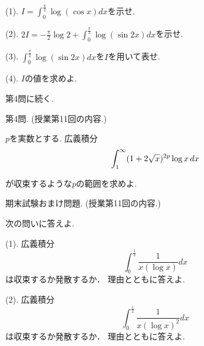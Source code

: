 \documentclass[dvipdfmx,a4paper,11pt]{article}
\theoremstyle{definition}
\begin{document}
     \vspace{11pt}
     
(1).  $I = \int_{0}^{\frac{\pi}{2}} \log (\cos x) dx$を示せ.

\vspace{11pt}

(2).  $2I = - \frac{\pi}{2}  \log 2 + \int_{0}^{\frac{\pi}{2}} \log (\sin 2x) dx$を示せ.

\vspace{11pt}

(3).  $\int_{0}^{\frac{\pi}{2}} \log (\sin 2x) dx$を$I$を用いて表せ.

\vspace{11pt}

(4). $I$の値を求めよ.

     
  \begin{flushright}
 {\LARGE 第4問に続く.}
 \end{flushright}
     
 \newpage
   
{\Large 第4問.} (授業第11回の内容.)
\vspace{11pt}

$p$を実数とする.
 広義積分
$$\int_{1}^{\infty} (1+2\sqrt{x})^{2p} \log x \text{\,}dx $$

が収束するような$p$の範囲を求めよ.
 


 \vspace{33pt}
 

{\Large 期末試験おまけ問題.} (授業第11回の内容.)
\vspace{11pt}

次の問いに答えよ.

\vspace{11pt}

(1). 広義積分
$$ \int_{0}^{\frac{1}{2}} \frac{1}{x (\log x)} dx$$
は収束するか発散するか． 理由とともに答えよ.
 
(2). 広義積分
$$ \int_{0}^{\frac{1}{2}} \frac{1}{x (\log x)^2} dx$$
は収束するか発散するか． 理由とともに答えよ.
 
\end{document}
